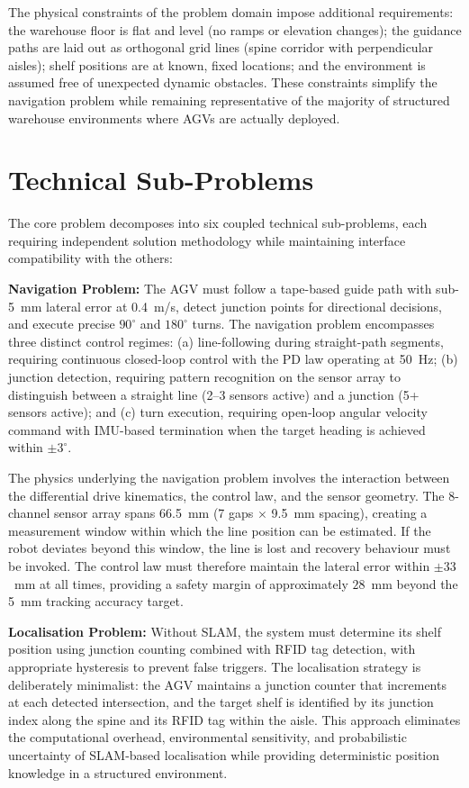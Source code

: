 \documentclass[12pt,a4paper,oneside]{report}
\begin{document}
The physical constraints of the problem domain impose additional requirements: the warehouse floor is flat and level (no ramps or elevation changes); the guidance paths are laid out as orthogonal grid lines (spine corridor with perpendicular aisles); shelf positions are at known, fixed locations; and the environment is assumed free of unexpected dynamic obstacles. These constraints simplify the navigation problem while remaining representative of the majority of structured warehouse environments where AGVs are actually deployed.

\section{Technical Sub-Problems}

The core problem decomposes into six coupled technical sub-problems, each requiring independent solution methodology while maintaining interface compatibility with the others:

\textbf{Navigation Problem:} The AGV must follow a tape-based guide path with sub-5~mm lateral error at 0.4~m/s, detect junction points for directional decisions, and execute precise $90^{\circ}$ and $180^{\circ}$ turns. The navigation problem encompasses three distinct control regimes: (a) line-following during straight-path segments, requiring continuous closed-loop control with the PD law operating at 50~Hz; (b) junction detection, requiring pattern recognition on the sensor array to distinguish between a straight line (2--3 sensors active) and a junction (5+ sensors active); and (c) turn execution, requiring open-loop angular velocity command with IMU-based termination when the target heading is achieved within $\pm 3^{\circ}$.

The physics underlying the navigation problem involves the interaction between the differential drive kinematics, the control law, and the sensor geometry. The 8-channel sensor array spans 66.5~mm (7 gaps $\times$ 9.5~mm spacing), creating a measurement window within which the line position can be estimated. If the robot deviates beyond this window, the line is lost and recovery behaviour must be invoked. The control law must therefore maintain the lateral error within $\pm 33$~mm at all times, providing a safety margin of approximately $28$~mm beyond the 5~mm tracking accuracy target.

\textbf{Localisation Problem:} Without SLAM, the system must determine its shelf position using junction counting combined with RFID tag detection, with appropriate hysteresis to prevent false triggers. The localisation strategy is deliberately minimalist: the AGV maintains a junction counter that increments at each detected intersection, and the target shelf is identified by its junction index along the spine and its RFID tag within the aisle. This approach eliminates the computational overhead, environmental sensitivity, and probabilistic uncertainty of SLAM-based localisation while providing deterministic position knowledge in a structured environment.
\end{document}
